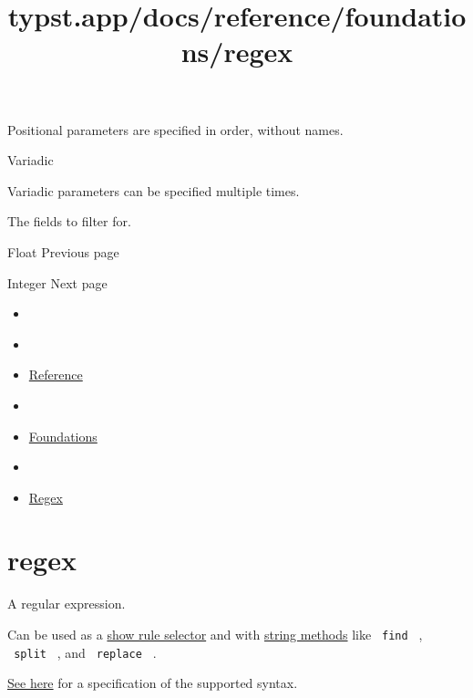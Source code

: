 \label{definitions-where-fields-positional-tooltip}
Positional parameters are specified in order, without names.

{{ Variadic }}

\label{definitions-where-fields-variadic-tooltip}
Variadic parameters can be specified multiple times.

The fields to filter for.

\href{/docs/reference/foundations/float/}{\pandocbounded{}}

{ Float } { Previous page }

\href{/docs/reference/foundations/int/}{\pandocbounded{}}

{ Integer } { Next page }


\title{typst.app/docs/reference/foundations/regex}

\begin{itemize}
\tightlist
\item
  \href{/docs}{}
\item
  
\item
  \href{/docs/reference/}{Reference}
\item
  
\item
  \href{/docs/reference/foundations/}{Foundations}
\item
  
\item
  \href{/docs/reference/foundations/regex/}{Regex}
\end{itemize}

\section{\texorpdfstring{{ regex }}{ regex }}\label{summary}

A regular expression.

Can be used as a \href{/docs/reference/styling/\#show-rules}{show rule
selector} and with \href{/docs/reference/foundations/str/}{string
methods} like \texttt{\ find\ } , \texttt{\ split\ } , and
\texttt{\ replace\ } .

\href{https://docs.rs/regex/latest/regex/\#syntax}{See here} for a
specification of the supported syntax.

